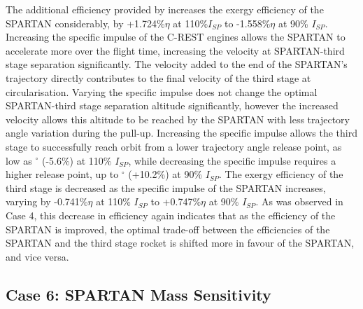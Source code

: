The additional efficiency provided by increases the exergy efficiency of the SPARTAN considerably, by +1.724\%$\eta$ at 110\%$I_{SP}$ to -1.558\%$\eta$ at 90\% $I_{SP}$. 
Increasing the specific impulse of the C-REST engines allows the SPARTAN to accelerate more over the flight time, increasing the velocity at SPARTAN-third stage separation significantly. The velocity added to the end of the SPARTAN's trajectory directly contributes to the final velocity of the third stage at circularisation. Varying the specific impulse does not change the optimal SPARTAN-third stage separation altitude significantly, however the increased velocity allows this altitude to be reached by the SPARTAN with less trajectory angle variation during the pull-up. Increasing the specific impulse allows the third stage to successfully reach orbit from a lower trajectory angle release point, as low as \secondthirdSeparationgammaIspOneHundredTenNoReturn$^\circ$ (-5.6\%) at 110\% $I_{SP}$, while decreasing the specific impulse requires a higher release point, up to \secondthirdSeparationgammaIspNinetyNoReturn$^\circ$ (+10.2\%) at 90\% $I_{SP}$.
The exergy efficiency of the third stage is decreased as the specific impulse of the SPARTAN increases, varying by -0.741\%$\eta$  at 110\% $I_{SP}$ to +0.747\%$\eta$  at 90\% $I_{SP}$. As was observed in Case 4, this decrease in efficiency again indicates that as the efficiency of the SPARTAN is improved, the optimal trade-off between the efficiencies of the SPARTAN and the third stage rocket is shifted more in favour of the SPARTAN, and vice versa. 


\subsection{Case 6: SPARTAN Mass Sensitivity}\label{sec:SpartanMassnoreturn}


